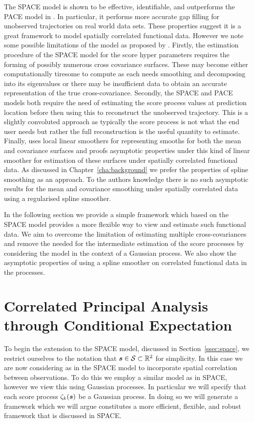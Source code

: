 The SPACE model is shown to be effective, identifiable, and outperforms the PACE model in \citep{liu_functional_2017}.
In particular, it performs more accurate gap filling for unobserved trajectories on real world data sets.
These properties suggest it is a great framework to model spatially correlated functional data.
However we note some possible limitations of the model as proposed by \citep{liu_functional_2017}.
Firstly, the estimation procedure of the SPACE model for the score hyper parameters requires the forming of possibly numerous cross covariance surfaces.
These may become either computationally tiresome to compute as each needs smoothing and decomposing into its eigenvalues or there may be insufficient data to obtain an accurate representation of the true cross-covariance. 
Secondly, the SPACE and PACE models both require the need of estimating the score process values at prediction location before then using this to reconstruct the unobserved trajectory.
This is a slightly convoluted approach as typically the score process is not what the end user needs but rather the full reconstruction is the useful quantity to estimate. 
Finally, \citep{liu_functional_2017} uses local linear smoothers for representing smooths for both the mean and covariance surfaces and proofs asymptotic properties under this kind of linear smoother for estimation of these surfaces under spatially correlated functional data.
As discussed in Chapter~\ref{cha:background} we prefer the properties of spline smoothing as an approach.
To the authors knowledge there is no such asymptotic results for the mean and covariance smoothing under spatially correlated data using a regularised spline smoother. 

In the following section we provide a simple framework which based on the SPACE model provides a more flexible way to view and estimate such functional data.
We aim to overcome the limitation of estimating multiple cross-covariances and remove the needed for the intermediate estimation of the score processes by considering the model in the context of a Gaussian process. 
We also show the asymptotic properties of using a spline smoother on correlated functional data in the processes.

\section{Correlated Principal Analysis through Conditional Expectation} 
To begin the extension to the SPACE model, discussed in Section~\ref{ssec:space}, we restrict ourselves to the notation that $\bm{{s}} \in \mathcal{S} \subset \mathbb{R}^2$ for simplicity.
In this case we are now considering as in the SPACE model to incorporate spatial correlation between observations. 
To do this we employ a similar model as in SPACE, however we view this using Gaussian processes.
In particular we will specify that each score process $\zeta_k(\bm{{s}})$ be a Gaussian process.
In doing so we will generate a framework which we will argue constitutes a more efficient, flexible, and robust framework that is discussed in SPACE. 


